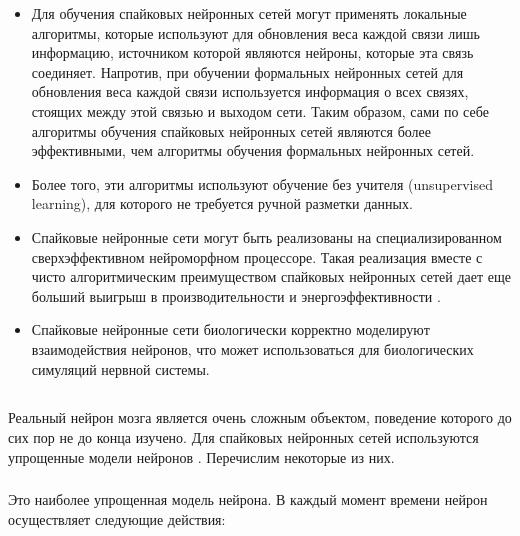 \documentclass[a4paper]{article}
\begin{document}
\begin{itemize}
\item Для обучения спайковых нейронных сетей могут применять локальные алгоритмы, которые используют для обновления веса каждой связи лишь информацию, источником которой являются нейроны, которые эта связь соединяет. Напротив, при обучении формальных нейронных сетей для обновления веса каждой связи используется информация о всех связях, стоящих между этой связью и выходом сети. Таким образом, сами по себе алгоритмы обучения спайковых нейронных сетей являются более эффективными, чем алгоритмы обучения формальных нейронных сетей.
\item Более того, эти алгоритмы используют обучение без учителя (unsupervised learning), для которого не требуется ручной разметки данных.
\item Спайковые нейронные сети могут быть реализованы на специализированном сверхэффективном нейроморфном процессоре. Такая реализация вместе с чисто алгоритмическим преимуществом спайковых нейронных сетей дает еще больший выигрыш в производительности и энергоэффективности \cite{hardware1, hardware2}. 
\item Спайковые нейронные сети биологически корректно моделируют взаимодействия нейронов, что может использоваться для биологических симуляций нервной системы.
\end{itemize}

\subsection{}
Реальный нейрон мозга является очень сложным объектом, поведение которого до сих пор не до конца изучено. Для спайковых нейронных сетей используются упрощенные модели нейронов \cite{neuronmodels}. Перечислим некоторые из них.

\subsubsection{}
Это наиболее упрощенная модель нейрона. В каждый момент времени нейрон осуществляет следующие действия:
\end{document}
